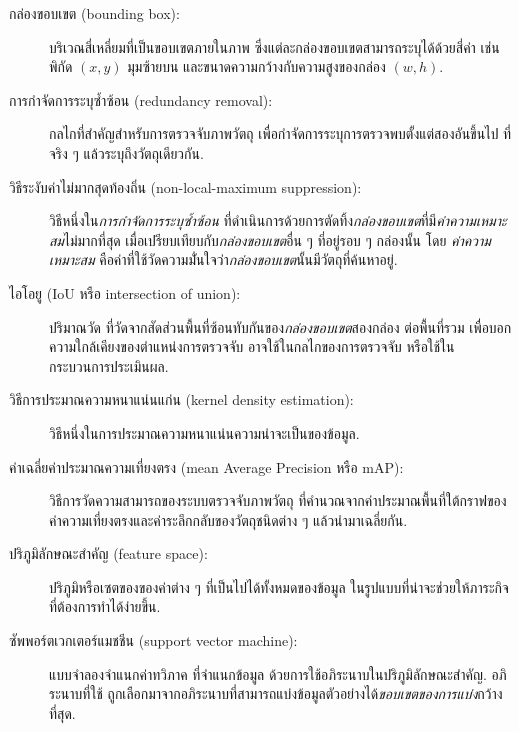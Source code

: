 \begin{description}
\item[กล่องขอบเขต (bounding box):]
บริเวณสี่เหลี่ยมที่เป็นขอบเขตภายในภาพ ซึ่งแต่ละกล่องขอบเขตสามารถระบุได้ด้วยสี่ค่า 
เช่น พิกัด $(x,y)$ มุมซ้ายบน และขนาดความกว้างกับความสูงของกล่อง $(w,h)$.

\item[การกำจัดการระบุซ้ำซ้อน (redundancy removal):]
กลไกที่สำคัญสำหรับการตรวจจับภาพวัตถุ 
เพื่อกำจัดการระบุการตรวจพบตั้งแต่สองอันขึ้นไป ที่จริง ๆ  แล้วระบุถึงวัตถุเดียวกัน.

\item[วิธีระงับค่าไม่มากสุดท้องถิ่น (non-local-maximum suppression):]
วิธีหนึ่งใน\textit{การกำจัดการระบุซ้ำซ้อน}
ที่ดำเนินการด้วยการตัดทิ้ง\textit{กล่องขอบเขต}ที่มี\textit{ค่าความเหมาะสม}ไม่มากที่สุด เมื่อเปรียบเทียบกับ\textit{กล่องขอบเขต}อื่น ๆ ที่อยู่รอบ ๆ กล่องนั้น
โดย \textit{ค่าความเหมาะสม}
คือค่าที่ใช้วัดความมั่่นใจว่า\textit{กล่องขอบเขต}นั้นมีวัตถุที่ค้นหาอยู่.

\item[ไอโอยู (IoU หรือ intersection of union):]
ปริมาณวัด 
ที่วัดจากสัดส่วนพื้นที่ซ้อนทับกันของ\textit{กล่องขอบเขต}สองกล่อง ต่อพื้นที่รวม 
เพื่อบอกความใกล้เคียงของตำแหน่งการตรวจจับ
อาจใช้ในกลไกของการตรวจจับ หรือใช้ในกระบวนการประเมินผล.

\item[วิธีการประมาณความหนาแน่นแก่น (kernel density estimation):]
วิธีหนึ่งในการประมาณความหนาแน่นความน่าจะเป็นของข้อมูล.

\item[ค่าเฉลี่ยค่าประมาณความเที่ยงตรง (mean Average Precision หรือ mAP):]
วิธีการวัดความสามารถของระบบตรวจจับภาพวัตถุ
ที่คำนวณจากค่าประมาณพื้นที่ใต้กราฟของค่าความเที่ยงตรงและค่าระลึกกลับของวัตถุชนิดต่าง ๆ
แล้วนำมาเฉลี่ยกัน.

\item[ปริภูมิลักษณะสำคัญ (feature space):]
ปริภูมิหรือเซตของของค่าต่าง ๆ ที่เป็นไปได้ทั้งหมดของข้อมูล ในรูปแบบที่น่าจะช่วยให้ภาระกิจที่ต้องการทำได้ง่ายขึ้น.

\item[ซัพพอร์ตเวกเตอร์แมชชีน (support vector machine):]
แบบจำลองจำแนกค่าทวิภาค 
ที่จำแนกข้อมูล ด้วยการใช้อภิระนาบในปริภูมิลักษณะสำคัญ.
อภิระนาบที่ใช้ ถูกเลือกมาจากอภิระนาบที่สามารถแบ่งข้อมูลตัวอย่างได้\textit{ขอบเขตของการแบ่ง}กว้างที่สุด.


\end{description}
